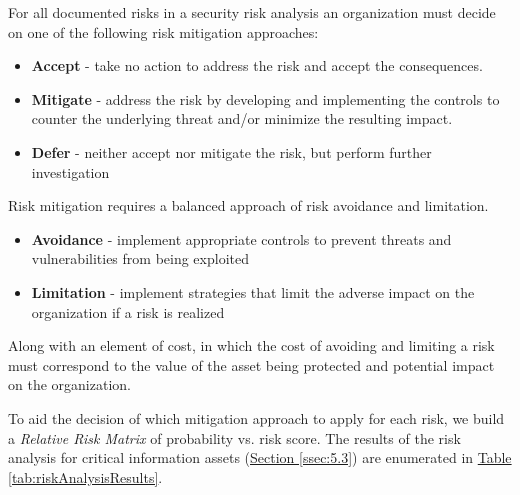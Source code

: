 \documentclass[a4paper,12pt]{article} %
\newcommand{\hypertableref}[1]{\hyperref[#1]{Table \ref{#1}}}
\newcommand{\hypersectionref}[1]{\hyperref[#1]{Section \ref{#1}}}
\begin{document}
{For all documented risks in a security risk analysis an organization must decide on one of the following risk mitigation approaches:

\begin{itemize}
	\item \textbf{Accept} - take no action to address the risk and accept the consequences.
	\item \textbf{Mitigate} - address the risk by developing and implementing the controls to counter the underlying threat and/or minimize the resulting impact.
	\item \textbf{Defer} - neither accept nor mitigate the risk, but perform further investigation
\end{itemize}

Risk mitigation requires a balanced approach of risk avoidance and limitation.

\begin{itemize}
	\item \textbf{Avoidance} - implement appropriate controls to prevent threats and vulnerabilities from being exploited
	\item \textbf{Limitation} - implement strategies that limit the adverse impact on the organization if a risk is realized
\end{itemize}

Along with an element of cost, in which the cost of avoiding and limiting a risk must correspond to the value of the asset being protected and potential impact on the organization.

To aid the decision of which mitigation approach to apply for each risk, we build a \textit{Relative Risk Matrix} of probability vs. risk score. The results of the risk analysis for critical information assets (\hypersectionref{ssec:5.3}) are enumerated in \hypertableref{tab:riskAnalysisResults}.

}
\end{document}
